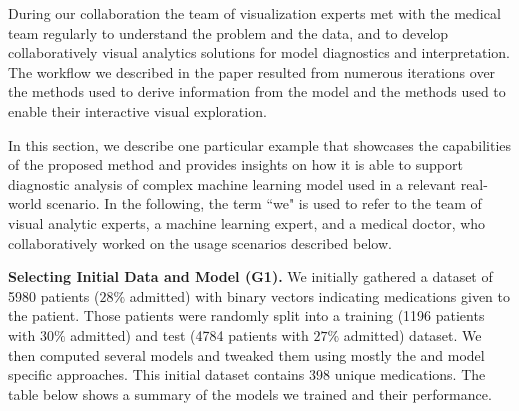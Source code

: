 


During our collaboration the team of visualization experts met with the medical team regularly to understand the problem and the data, and to develop collaboratively visual analytics solutions for model diagnostics and interpretation. The workflow we described in the paper resulted from numerous iterations over the methods used to derive information from the model and the methods used to enable their interactive visual exploration.

In this section, we describe one particular example that showcases the capabilities of the proposed method and provides insights on how it is able to support diagnostic analysis of complex machine learning model used in a relevant real-world scenario. In the following, the term ``we" is used to refer to the team of visual analytic experts, a machine learning expert, and a medical doctor, who collaboratively worked on the usage scenarios described below.

\noindent \textbf{Selecting Initial Data and Model (G1).}
We initially gathered a dataset of 5980 patients ($28\%$ admitted) with binary vectors indicating medications given to the patient. Those patients were randomly split into a training (1196 patients with $30\%$ admitted) and test (4784 patients with $27\%$ admitted) dataset. We then computed several models and tweaked them using mostly the \tabA and model specific approaches.
This initial dataset contains 398 unique medications.
The table below shows a summary of the models we trained and their performance.


